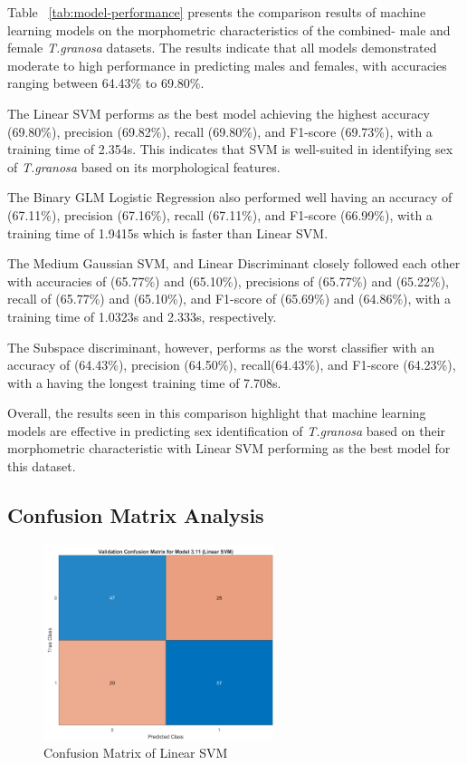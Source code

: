 Table ~\ref{tab:model-performance} presents the comparison results of machine learning models on the morphometric characteristics of the combined- male and female \textit{T.granosa} datasets. The results indicate that all models demonstrated moderate to high performance in predicting males and females, with accuracies ranging between 64.43\% to 69.80\%. 

The Linear SVM performs as the best model achieving the highest accuracy (69.80\%), precision (69.82\%), recall (69.80\%), and F1-score (69.73\%), with a training time of 2.354s. This indicates that SVM is well-suited in identifying sex of \textit{T.granosa} based on its morphological features. 

The Binary GLM Logistic Regression also performed well having an accuracy of (67.11\%), precision (67.16\%), recall (67.11\%), and F1-score (66.99\%), with a training time of 1.9415s which is faster than Linear SVM. 

The Medium Gaussian SVM, and Linear Discriminant closely followed each other with accuracies of (65.77\%) and (65.10\%), precisions of (65.77\%) and (65.22\%), recall of (65.77\%) and (65.10\%), and F1-score of (65.69\%) and (64.86\%), with a training time of 1.0323s and 2.333s, respectively. 

The Subspace discriminant, however, performs as the worst classifier with an accuracy of (64.43\%), precision (64.50\%), recall(64.43\%), and F1-score (64.23\%), with a having the longest training time of 7.708s. 

Overall, the results seen in this comparison highlight that machine learning models are effective in predicting sex identification of \textit{T.granosa} based on their morphometric characteristic with Linear SVM performing as the best model for this dataset. 


\subsection{Confusion Matrix Analysis}
\begin{figure}[!htbp]
	\centering
	\includegraphics[width=0.6\textwidth]{figures/confusion-matrix.png}
	\caption{Confusion Matrix of Linear SVM}
	\label{fig:confusion-matrix}
\end{figure}


